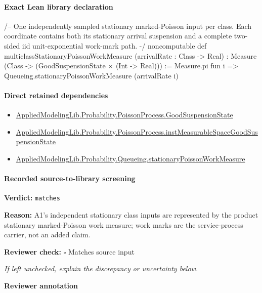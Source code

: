 \documentclass[10pt]{article}
\newcommand{\reviewerbox}{%
  \par\noindent\fbox{\parbox{0.96\linewidth}{\rule{0pt}{0.38in}}}\par
}
\newcommand{\reviewmatch}[1]{%
  \par\noindent\textbf{Reviewer check:} $\square$\; #1\par
  \noindent\emph{If left unchecked, explain the discrepancy or uncertainty below.}\par
}
\begin{document}
\paragraph{Exact Lean library declaration}
\begin{ReviewVerbatim}
/-- One independently sampled stationary marked-Poisson input per class.
Each coordinate contains both its stationary arrival suspension and a complete
two-sided iid unit-exponential work-mark path. -/
noncomputable def multiclassStationaryPoissonWorkMeasure (arrivalRate : Class -> Real) :
    Measure (Class -> (GoodSuspensionState × (Int -> Real))) :=
  Measure.pi fun i => Queueing.stationaryPoissonWorkMeasure (arrivalRate i)
\end{ReviewVerbatim}

\paragraph{Direct retained dependencies}
\begin{itemize}\raggedright
\item \hyperlink{governing-declaration-ab1cfe37ad8c32b0}{Applied\allowbreak{}Modeling\allowbreak{}Lib.\allowbreak{}Probability.\allowbreak{}Poisson\allowbreak{}Process.\allowbreak{}Good\allowbreak{}Suspension\allowbreak{}State}
\item \hyperlink{governing-declaration-a8385d799d0a4d16}{Applied\allowbreak{}Modeling\allowbreak{}Lib.\allowbreak{}Probability.\allowbreak{}Poisson\allowbreak{}Process.\allowbreak{}inst\allowbreak{}Measurable\allowbreak{}Space\allowbreak{}Good\allowbreak{}Suspension\allowbreak{}State}
\item \hyperlink{governing-declaration-10a259bddd1a9d6f}{Applied\allowbreak{}Modeling\allowbreak{}Lib.\allowbreak{}Probability.\allowbreak{}Queueing.\allowbreak{}stationary\allowbreak{}Poisson\allowbreak{}Work\allowbreak{}Measure}
\end{itemize}
\paragraph{Recorded source-to-library screening}
\textbf{Verdict:} \texttt{matches}
\\
{\raggedright
\textbf{Reason:} A1's independent stationary class inputs are represented by the product stationary marked-\allowbreak{}Poisson work measure;\allowbreak{} work marks are the service-\allowbreak{}process carrier, not an added claim.\allowbreak{}
\par}
\reviewmatch{Matches source input}
\noindent\textbf{Reviewer annotation}\par
\reviewerbox
\clearpage
\hypertarget{library-prerequisite-4b8788f2f9337ce3}{}
\end{document}
